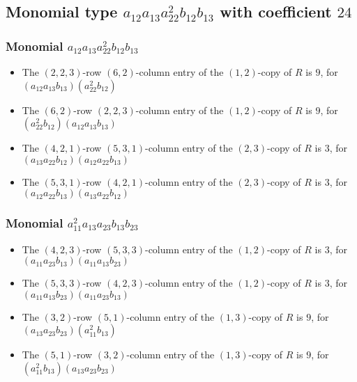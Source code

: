 \documentclass{article}
\begin{document}
\subsection{Monomial type $ a_{12} a_{13} a_{22}^{2} b_{12} b_{13} $ with coefficient $ 24 $}

\subsubsection{Monomial $ a_{12} a_{13} a_{22}^{2} b_{12} b_{13} $}

\begin{itemize}
\item The $(2, 2, 3)$-row $(6, 2)$-column entry of the $ \left(1, 2\right) $-copy of $R$ is $ 9 $, for $( a_{12} a_{13} b_{13} )( a_{22}^{2} b_{12} )$ 
\item The $(6, 2)$-row $(2, 2, 3)$-column entry of the $ \left(1, 2\right) $-copy of $R$ is $ 9 $, for $( a_{22}^{2} b_{12} )( a_{12} a_{13} b_{13} )$ 
\item The $(4, 2, 1)$-row $(5, 3, 1)$-column entry of the $ \left(2, 3\right) $-copy of $R$ is $ 3 $, for $( a_{13} a_{22} b_{12} )( a_{12} a_{22} b_{13} )$ 
\item The $(5, 3, 1)$-row $(4, 2, 1)$-column entry of the $ \left(2, 3\right) $-copy of $R$ is $ 3 $, for $( a_{12} a_{22} b_{13} )( a_{13} a_{22} b_{12} )$ 
\end{itemize}
\subsubsection{Monomial $ a_{11}^{2} a_{13} a_{23} b_{13} b_{23} $}

\begin{itemize}
\item The $(4, 2, 3)$-row $(5, 3, 3)$-column entry of the $ \left(1, 2\right) $-copy of $R$ is $ 3 $, for $( a_{11} a_{23} b_{13} )( a_{11} a_{13} b_{23} )$ 
\item The $(5, 3, 3)$-row $(4, 2, 3)$-column entry of the $ \left(1, 2\right) $-copy of $R$ is $ 3 $, for $( a_{11} a_{13} b_{23} )( a_{11} a_{23} b_{13} )$ 
\item The $(3, 2)$-row $(5, 1)$-column entry of the $ \left(1, 3\right) $-copy of $R$ is $ 9 $, for $( a_{13} a_{23} b_{23} )( a_{11}^{2} b_{13} )$ 
\item The $(5, 1)$-row $(3, 2)$-column entry of the $ \left(1, 3\right) $-copy of $R$ is $ 9 $, for $( a_{11}^{2} b_{13} )( a_{13} a_{23} b_{23} )$ 
\end{itemize}
\end{document}
